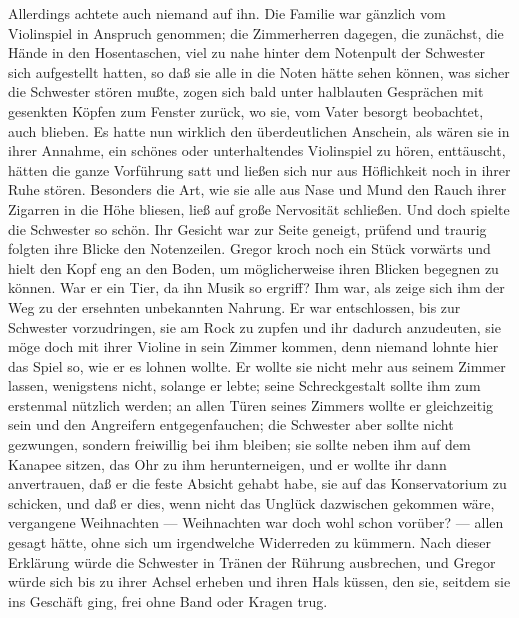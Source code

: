 Allerdings achtete auch niemand auf ihn. Die Familie war gänzlich vom
Violinspiel in Anspruch genommen; die Zimmerherren dagegen, die
zunächst, die Hände in den Hosentaschen, viel zu nahe hinter dem
Notenpult der Schwester sich aufgestellt hatten, so daß sie alle in die
Noten hätte sehen können, was sicher die Schwester stören mußte, zogen
sich bald unter halblauten Gesprächen mit gesenkten Köpfen zum Fenster
zurück, wo sie, vom Vater besorgt beobachtet, auch blieben. Es hatte nun
wirklich den überdeutlichen Anschein, als wären sie in ihrer Annahme,
ein schönes oder unterhaltendes Violinspiel zu hören, enttäuscht, hätten
die ganze Vorführung satt und ließen sich nur aus Höflichkeit noch in
ihrer Ruhe stören. Besonders die Art, wie sie alle aus Nase und Mund den
Rauch ihrer Zigarren in die Höhe bliesen, ließ auf große Nervosität
schließen. Und doch spielte die Schwester so schön. Ihr Gesicht war zur
Seite geneigt, prüfend und traurig folgten ihre Blicke den Notenzeilen.
Gregor kroch noch ein Stück vorwärts und hielt den Kopf eng an den
Boden, um möglicherweise ihren Blicken begegnen zu können. War er ein
Tier, da ihn Musik so ergriff? Ihm war, als zeige sich ihm der Weg zu
der ersehnten unbekannten Nahrung. Er war entschlossen, bis zur
Schwester vorzudringen, sie am Rock zu zupfen und ihr dadurch
anzudeuten, sie möge doch mit ihrer Violine in sein Zimmer kommen, denn
niemand lohnte hier das Spiel so, wie er es lohnen wollte. Er wollte sie
nicht mehr aus seinem Zimmer lassen, wenigstens nicht, solange er lebte;
seine Schreckgestalt sollte ihm zum erstenmal nützlich werden; an allen
Türen seines Zimmers wollte er gleichzeitig sein und den Angreifern
entgegenfauchen; die Schwester aber sollte nicht gezwungen, sondern
freiwillig bei ihm bleiben; sie sollte neben ihm auf dem Kanapee sitzen,
das Ohr zu ihm herunterneigen, und er wollte ihr dann anvertrauen, daß
er die feste Absicht gehabt habe, sie auf das Konservatorium zu
schicken, und daß er dies, wenn nicht das Unglück dazwischen gekommen
wäre, vergangene Weihnachten --- Weihnachten war doch wohl schon vorüber?
--- allen gesagt hätte, ohne sich um irgendwelche Widerreden zu kümmern.
Nach dieser Erklärung würde die Schwester in Tränen der Rührung
ausbrechen, und Gregor würde sich bis zu ihrer Achsel erheben und ihren
Hals küssen, den sie, seitdem sie ins Geschäft ging, frei ohne Band oder
Kragen trug.

